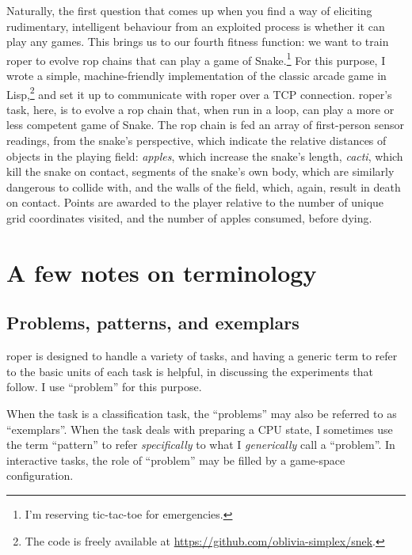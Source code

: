 \documentclass[12pt,glossary]{dalthesis}
\begin{document}
Naturally, the first question that comes up when you find a way of eliciting
rudimentary, intelligent behaviour from an exploited process is whether it
can play any games. This brings us to our fourth fitness function: we want
to train \gls{roper} to evolve \gls{rop} chains that can play a game of Snake.\footnote{I'm reserving tic-tac-toe for emergencies.} For this purpose, I wrote a simple, machine-friendly implementation of the
classic arcade game in Lisp,\footnote{The code is freely available at \url{https://github.com/oblivia-simplex/snek}.} and set it up to communicate with \gls{roper} over
a TCP connection. \Gls{roper}'s task, here, is to evolve a \gls{rop} chain that,
when run in a loop, can play a more or less competent game of Snake. The \gls{rop}
chain is fed an array of first-person sensor readings, from the snake's perspective,
which indicate the relative distances of objects in the playing field: \emph{apples},
which increase the snake's length, \emph{cacti}, which kill the snake on contact, 
segments of the snake's own body, which are similarly dangerous to collide with,
and the walls of the field, which, again, result in death on contact. 
Points are awarded to the player relative to the number of unique grid coordinates
visited, and the number of apples consumed, before dying. 




\section{A few notes on terminology}
\label{sec:org200efce}
\label{org7111900}

\subsection{Problems, patterns, and exemplars}
\label{sec:org7c7e80f}
\label{orgec7db0d}

\Gls{roper} is designed to handle a variety of tasks, and having a generic term
to refer to the basic units of each task is helpful, in discussing the experiments
that follow. I use ``problem'' for this purpose. 

When the task is a classification task, the ``problems'' may also be referred to as
``exemplars''. When the task deals with preparing a CPU state, I sometimes use the
term ``pattern'' to refer \emph{specifically} to what I \emph{generically} call a ``problem''. 
In interactive tasks, the role of ``problem'' may be filled by a game-space configuration. 
\end{document}
